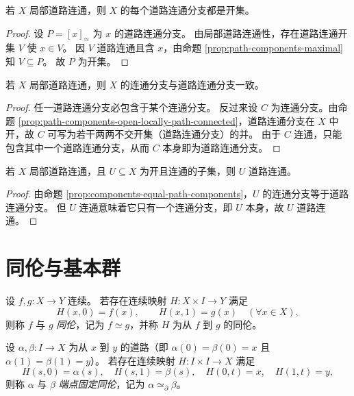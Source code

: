\documentclass[lang=cn,a4paper,newtx,figureplace=section,tableplace=section]{elegantbook}
\begin{document}
\begin{proposition}\label{prop:path-components-open-locally-path-connected}
  若 $X$ 局部道路连通，则 $X$ 的每个道路连通分支都是开集。
\end{proposition}
\begin{proof}
  设 $P=[x]_{\approx}$ 为 $x$ 的道路连通分支。
  由局部道路连通性，存在道路连通开集 $V$ 使 $x\in V$。
  因 $V$ 道路连通且含 $x$，由命题 \ref{prop:path-components-maximal} 知 $V\subseteq P$。
  故 $P$ 为开集。
\end{proof}

\begin{proposition}\label{prop:components-equal-path-components}
  若 $X$ 局部道路连通，则 $X$ 的连通分支与道路连通分支一致。
\end{proposition}
\begin{proof}
  任一道路连通分支必包含于某个连通分支。
  反过来设 $C$ 为连通分支。由命题 \ref{prop:path-components-open-locally-path-connected}，道路连通分支在 $X$ 中开，故 $C$ 可写为若干两两不交开集（道路连通分支）的并。
  由于 $C$ 连通，只能包含其中一个道路连通分支，从而 $C$ 本身即为道路连通分支。
\end{proof}

\begin{corollary}\label{cor:open-connected-implies-path-connected}
  若 $X$ 局部道路连通，且 $U\subseteq X$ 为开且连通的子集，则 $U$ 道路连通。
\end{corollary}
\begin{proof}
  由命题 \ref{prop:components-equal-path-components}，$U$ 的连通分支等于道路连通分支。
  但 $U$ 连通意味着它只有一个连通分支，即 $U$ 本身，故 $U$ 道路连通。
\end{proof}

\section{同伦与基本群}

\begin{definition}[映射同伦]\label{def:homotopy}
  设 $f,g:X\to Y$ 连续。
  若存在连续映射 $H:X\times I\to Y$ 满足
  \[
    H(x,0)=f(x),\qquad H(x,1)=g(x)\quad(\forall x\in X),
  \]
  则称 $f$ 与 $g$ \emph{同伦}，记为 $f\simeq g$，并称 $H$ 为从 $f$ 到 $g$ 的同伦。
\end{definition}

\begin{definition}\label{def:path-homotopy}
  设 $\alpha,\beta:I\to X$ 为从 $x$ 到 $y$ 的道路（即 $\alpha(0)=\beta(0)=x$ 且 $\alpha(1)=\beta(1)=y$）。
  若存在连续映射 $H:I\times I\to X$ 满足
  \[
    H(s,0)=\alpha(s),\quad H(s,1)=\beta(s),\quad H(0,t)=x,\quad H(1,t)=y,
  \]
  则称 $\alpha$ 与 $\beta$ \emph{端点固定同伦}，记为 $\alpha\simeq_{\partial}\beta$。
\end{definition}
\end{document}
